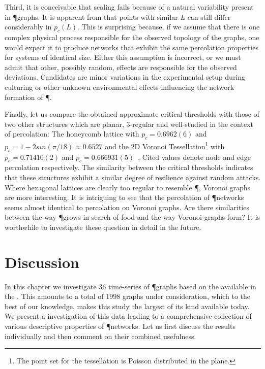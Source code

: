 		Third, it is conceivable that scaling fails because of a natural variability present in \P graphs. It is apparent from  that points with similar $L$ can still differ considerably in $p_c(L)$. This is surprising because, if we assume that there is one complex physical process responsible for the observed topology of the graphs, one would expect it to produce networks that exhibit the same percolation properties for systems of identical size. Either this assumption is incorrect, or we must admit that other, possibly random, effects are responsible for the observed deviations. Candidates are minor variations in the experimental setup during culturing or other unknown environmental effects influencing the network formation of \P.

		Finally, let us compare the obtained approximate critical thresholds with those of two other structures which are planar, $3$-regular and well-studied in the context of percolation: The honeycomb lattice with $p_c = 0.6962(6)$ and $p_c = 1-2 sin (\pi/18) \approx 0.6527$ and the 2D Voronoi Tessellation\footnote{The point set for the tessellation is Poisson distributed in the plane.} with $p_c = 0.71410(2)$ and $p_c = 0.666931(5)$~\cite{djordjevic1982site,becker2009percolation}. Cited values denote node and edge percolation respectively. The similarity between the critical thresholds indicates that these structures exhibit a similar degree of resilience against random attacks. Where hexagonal lattices are clearly too regular to resemble \P, Voronoi graphs are more interesting. It is intriguing to see that the percolation of \P networks seems almost identical to percolation on Voronoi graphs. Are there similarities between the way \P grows in search of food and the way Voronoi graphs form? It is worthwhile to investigate these question in detail in the future.


	\section{Discussion}

		In this chapter we investigate $36$ time-series of \P graphs based on the \data available in the \SMGR. This amounts to a total of $1998$ graphs under consideration, which to the best of our knowledge, makes this study the largest of its kind available today. We present a investigation of this data leading to a comprehensive collection of various descriptive properties of \P networks. Let us first discuss the results individually and then comment on their combined usefulness.

